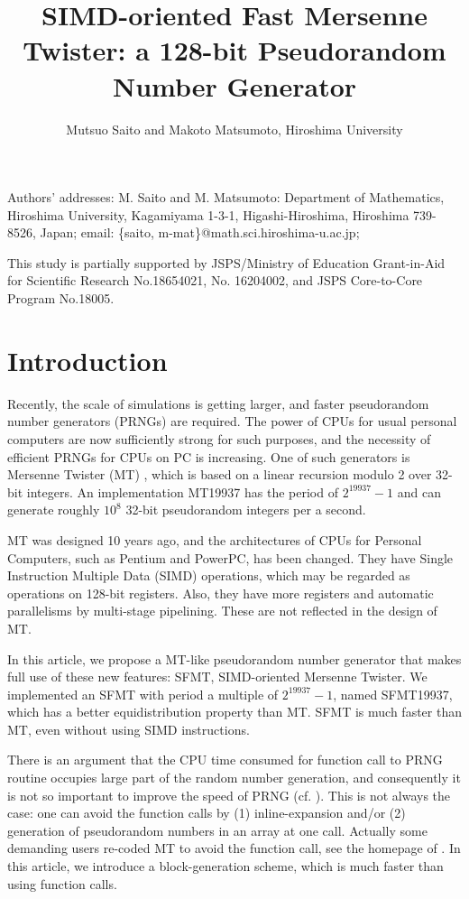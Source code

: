 \documentclass[acmnow]{acmtrans2m}
\title{SIMD-oriented Fast Mersenne Twister:
a 128-bit Pseudorandom Number Generator
}
\author{Mutsuo Saito and Makoto Matsumoto, Hiroshima University \\
}
\begin{document}
\maketitle

\begin{bottomstuff}
Authors' addresses: 
M. Saito and M. Matsumoto: Department of Mathematics, Hiroshima University,
Kagamiyama 1-3-1, Higashi-Hiroshima, Hiroshima 739-8526, Japan;
email: \{saito, m-mat\}@math.sci.hiroshima-u.ac.jp;

This study is partially supported by JSPS/Ministry of Education
Grant-in-Aid for Scientific Research No.18654021, No. 16204002,
and JSPS Core-to-Core Program No.18005.
\end{bottomstuff}

\section{Introduction}
Recently, the scale of simulations is getting larger,
and faster pseudorandom number generators (PRNGs)
are required. The power of CPUs for
usual personal computers are now sufficiently strong
for such purposes, and the necessity of efficient PRNGs 
for CPUs on PC is increasing.
One of such generators is Mersenne Twister (MT) \cite{MT},
which is based on a linear recursion modulo 2 over 32-bit
integers. An implementation MT19937 has 
the period of $2^{19937}-1$ and 
can generate
roughly $10^8$ 32-bit pseudorandom integers per a second.

MT was designed 10 years ago,
and the architectures of CPUs for Personal Computers,
such as Pentium and PowerPC, has been changed.
They have
Single Instruction Multiple Data (SIMD) operations,
which may be regarded as operations 
on 128-bit registers. Also, they have more registers
and automatic parallelisms by multi-stage pipelining. 
These are not reflected in the design of MT. 

In this article, we propose a MT-like 
pseudorandom number generator
that makes full use of these new features: SFMT, 
SIMD-oriented Mersenne Twister. 
We implemented an SFMT with period a multiple of $2^{19937}-1$, named
SFMT19937,
which has a better equidistribution property than MT. 
SFMT is much faster than MT, even without using SIMD instructions. 

There is an argument that the CPU time consumed for 
function call to PRNG routine occupies large part of
the random number generation, and consequently 
it is not so important to improve the speed of PRNG 
(cf. \cite{XORSHIFT}).
This is not always the case: 
one can avoid the function calls by (1) inline-expansion
and/or (2) generation of pseudorandom numbers in an array
at one call. Actually some demanding users re-coded MT to avoid the 
function call, see the homepage of \cite{MT}. 
In this article, we introduce a block-generation scheme, which 
is much faster than using function calls.
\end{document}
